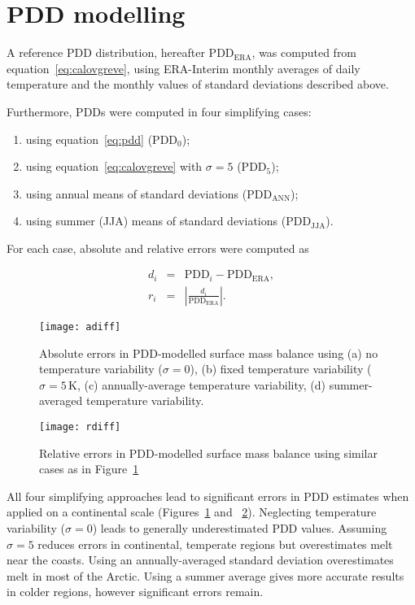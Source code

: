 \documentclass[twocolumn]{igs}
\begin{document}

\section{PDD modelling}

A reference PDD distribution, hereafter $\mathrm{PDD_{ERA}}$, was computed from equation~\ref{eq:calovgreve}, using ERA-Interim monthly averages of daily temperature and the monthly values of standard deviations described above.

Furthermore, PDDs were computed in four simplifying cases:

\begin{enumerate}
  \item using equation~\ref{eq:pdd} ($\mathrm{PDD_{0}}$);
  \item using equation~\ref{eq:calovgreve} with $\sigma=5$ ($\mathrm{PDD_{5}}$);
  \item using annual means of standard deviations ($\mathrm{PDD_{ANN}}$);
  \item using summer (JJA) means of standard deviations ($\mathrm{PDD_{JJA}}$).
\end{enumerate}

For each case, absolute and relative errors were computed as

\begin{eqnarray}
  d_i &=& \mathrm{PDD}_i - \mathrm{PDD_{ERA}}, \\
  r_i &=& \left|\frac{d_i}{\mathrm{PDD_{ERA}}}\right|.
\end{eqnarray}

\begin{figure}
  \centering\texttt{[image: adiff]}
  \caption{Absolute errors in PDD-modelled surface mass balance using (a) no temperature variability ($\sigma=0$), (b) fixed temperature variability ($\sigma=5\,\mathrm{K}$, (c) annually-average temperature variability, (d) summer-averaged temperature variability.}
  \label{fig:adiff}
\end{figure}

\begin{figure}
  \centering\texttt{[image: rdiff]}
  \caption{Relative errors in PDD-modelled surface mass balance using similar cases as in Figure~\ref{fig:adiff}}
  \label{fig:rdiff}
\end{figure}

All four simplifying approaches lead to significant errors in PDD estimates when applied on a continental scale (Figures~\ref{fig:adiff} and ~\ref{fig:rdiff}). Neglecting temperature variability ($\sigma=0$) leads to generally underestimated PDD values. Assuming $\sigma=5$ reduces errors in continental, temperate regions but overestimates melt near the coasts. Using an annually-averaged standard deviation overestimates melt in most of the Arctic. Using a summer average gives more accurate results in colder regions, however significant errors remain.
\end{document}

